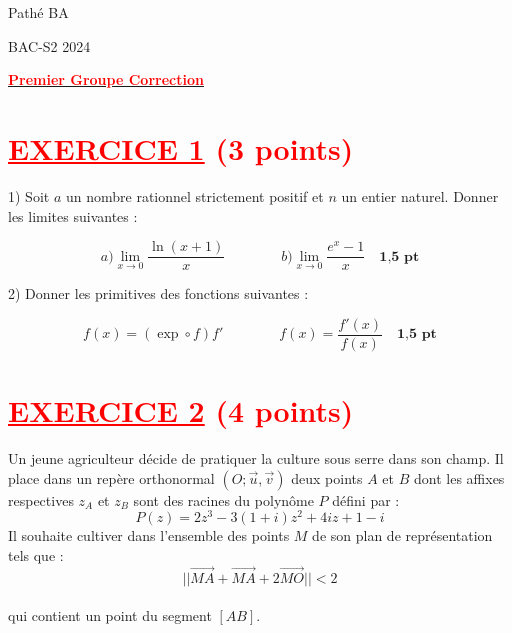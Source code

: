 \documentclass[12pt]{article}
\begin{document}
\begin{minipage}{0.8\textwidth}
	Pathé BA                          
\end{minipage}
\begin{minipage}{0.8\textwidth}
	BAC-S2 2024
\end{minipage}

\begin{center}
\textbf{{\underline{\textcolor{red}{Premier Groupe Correction}}}}
\end{center}





\section*{\textcolor{red}{\underline{EXERCICE 1} (3 points) }}
1) Soit \(a\) un nombre rationnel strictement positif et \(n\) un entier naturel. Donner les limites suivantes :

\[
a) \lim_{x \to 0} \frac{\ln(x+1)}{x}\quad\quad\quad\quad b) \lim_{x \to 0} \frac{e^x - 1}{x}\quad \textbf{1,5 pt} \]


2) Donner les primitives des fonctions suivantes :

\[
 f(x) = ( \exp \circ f)f' \quad\quad\quad\quad f(x) = \frac{f'(x)}{f(x)}  \quad \textbf{1,5 pt}
\]

\section*{\textcolor{red}{\underline{EXERCICE 2} (4 points) }}
Un jeune agriculteur décide de pratiquer la culture sous serre dans son champ. Il place dans un repère orthonormal \( (O; \vec{u}, \vec{v}) \) deux points \( A \) et \( B \) dont les affixes respectives \( z_A \) et \( z_B \) sont des racines du polynôme \( P \) défini par :
\[
P(z) = 2z^3 - 3(1+i)z^2 + 4iz + 1 - i
\]
Il souhaite cultiver dans l'ensemble des points \( M \) de son plan de représentation tels que :
\[
||\overrightarrow{MA} + \overrightarrow{MA} + 2\overrightarrow{MO}|| < 2
\]\\
qui contient un point du segment \( [AB] \).
\end{document}
